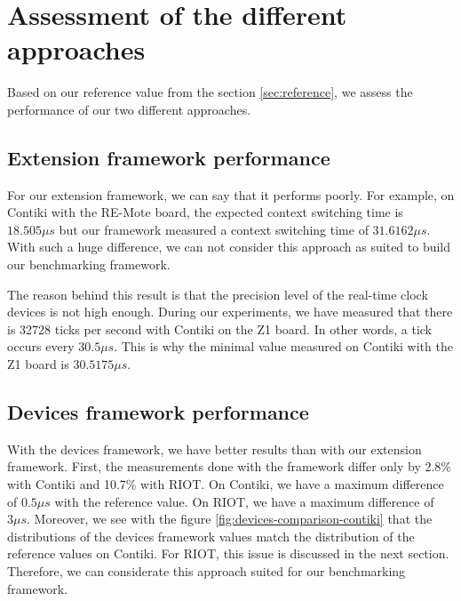 \section{Assessment of the different approaches}

Based on our reference value from the section \ref{sec:reference}, we assess the performance of our two different approaches.

\subsection{Extension framework performance}

For our extension framework, we can say that it performs poorly.
For example, on Contiki with the RE-Mote board, the expected context switching time is $18.505\mu s$ but our framework measured a context switching time of $31.6162\mu s$.
With such a huge difference, we can not consider this approach as suited to build our benchmarking framework.

The reason behind this result is that the precision level of the real-time clock devices is not high enough.
During our experiments, we have measured that there is 32728 ticks per second with Contiki on the Z1 board.
In other words, a tick occurs every $30.5\mu s$.
This is why the minimal value measured on Contiki with the Z1 board is $30.5175\mu s$.

\subsection{Devices framework performance}

With the devices framework, we have better results than with our extension framework.
First, the measurements done with the framework differ only by 2.8\% with Contiki and 10.7\% with RIOT.
On Contiki, we have a maximum difference of $0.5\mu s$ with the reference value.
On RIOT, we have a maximum difference of $3\mu s$.
Moreover, we see with the figure \ref{fig:devices-comparison-contiki} that the distributions of the devices framework values match the distribution of the reference values on Contiki.
For RIOT, this issue is discussed in the next section.
Therefore, we can considerate this approach suited for our benchmarking framework.

